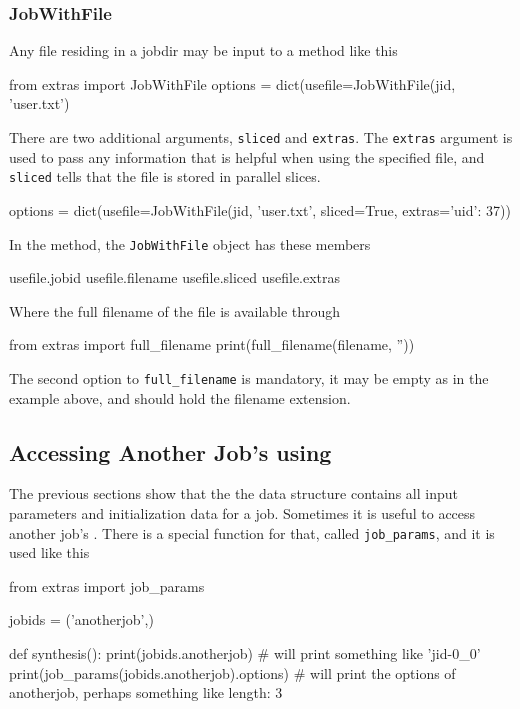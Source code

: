 \subsubsection*{JobWithFile}
Any file residing in a jobdir may be input to a method like this
\begin{python}
from extras import JobWithFile
options = dict(usefile=JobWithFile(jid, 'user.txt')
\end{python}
There are two additional arguments, \texttt{sliced} and
\texttt{extras}.  The \texttt{extras} argument is used to pass any
information that is helpful when using the specified file, and
\texttt{sliced} tells that the file is stored in parallel slices.
\begin{python}
options = dict(usefile=JobWithFile(jid, 'user.txt', sliced=True, extras={'uid': 37}))
\end{python}
In the method, the \texttt{JobWithFile} object has these members
\begin{python}
usefile.jobid
usefile.filename
usefile.sliced
usefile.extras
\end{python}
Where the full filename of the file is available through
\begin{python}
from extras import full_filename
print(full_filename(filename, ''))
\end{python}
The second option to \texttt{full\_filename} is mandatory, it may be
empty as in the example above, and should hold the filename extension.



\subsection{Accessing Another Job's \params using \jobparams}

The previous sections show that the the \params data structure
contains all input parameters and initialization data for a job.
Sometimes it is useful to access another job's \params.  There is a
special function for that, called \texttt{job\_params}, and it is used
like this
\begin{python}
from extras import job_params

jobids = ('anotherjob',)

def synthesis():
    print(jobids.anotherjob)
    # will print something like 'jid-0_0'
    print(job_params(jobids.anotherjob).options)
    # will print the options of anotherjob, perhaps something like {length: 3}
\end{python}

